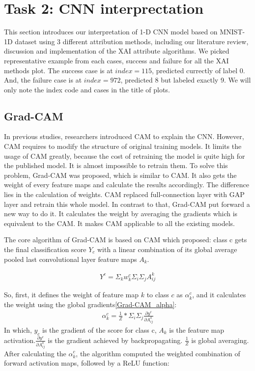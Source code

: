 \documentclass[conference]{IEEEtran}
\begin{document}
\section{Task 2: CNN interprectation}

This section introduces our interpretation of 1-D CNN model based on MNIST-1D dataset using 3 different attribution methods, including our literature review, discussion and implementation of the XAI attribute algorithms. We picked representative example from each cases, success and failure for all the XAI methods plot. The success case is at $index=115$, predicted currectly of label 0. And, the failure case is at $index=972$, predicted 8 but labeled exactly 9. We will only note the index code and cases in the title of plots.
\subsection{Grad-CAM}
In previous studies, researchers introduced CAM to explain the CNN. However, CAM requires to modify the structure of original training models. It limits the usage of CAM greatly, because the cost of retraining the model is quite high for the published model. It is almost impossible to retrain them.
To solve this problem, Grad-CAM was proposed, which is similar to CAM. It also gets the weight of every feature maps and calculate the results accordingly. The difference lies in the calculation of weights. CAM replaced full-connection layer with GAP layer and retrain this whole model. In contrast to that, Grad-CAM put forward a new way to do it.
It calculates the weight by averaging the gradients which is equivalent to the CAM. It makes CAM applicable to all the existing models.\par

The core algorithm of Grad-CAM is based on CAM which proposed: class c gets the final classification score $Y_{c}$ with a linear combination of its global average pooled last convolutional layer feature maps $A_{k}$.

\begin{equation}
    \begin{aligned}
        Y^{c}=\Sigma_{k}w_{k}^{c}\Sigma_{i}\Sigma_{j}A_{ij}^{k}
        \label{Grad-CAM_Y}
    \end{aligned}
  \end{equation}

So, first, it defines the weight of feature map $k$ to class $c$ as $\alpha_{k}^{c}$, and it calculates the weight using the global gradients\ref{Grad-CAM_alpha}:
\begin{equation}
    \begin{aligned}
        \alpha_{k}^{c}=\frac{1}{Z}*\Sigma_{i}\Sigma_{j}\frac{\partial y^{c}}{\partial A_{ij}^{k}}
        \label{Grad-CAM_alpha}
    \end{aligned}
  \end{equation}
  In which, $y_{c}$ is the gradient of the score for class c, $A_{k}$ is the feature map activation.$\frac{\partial y^{c}}{\partial A_{ij}^{k}}$ is the gradient achieved by backpropagating. $\frac{1}{Z}$ is global averaging.
  After calculating the $\alpha_{k}^{c}$, the algorithm computed the weighted combination of forward activation maps, followed by a ReLU function:
\end{document}
